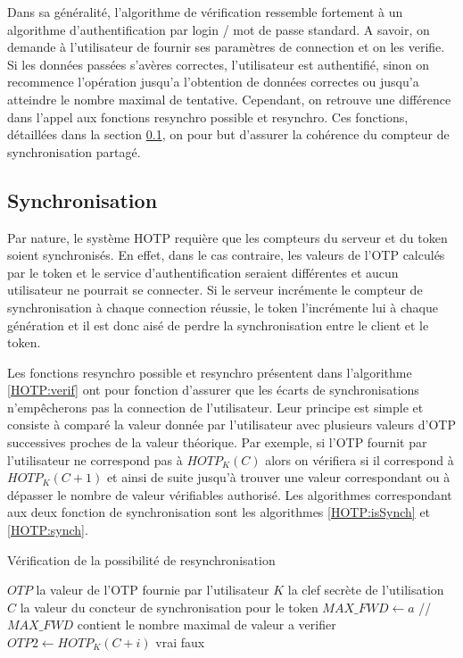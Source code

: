 \documentclass{../res/univ-projet}
\begin{document}
  Dans sa généralité, l'algorithme de vérification ressemble fortement à un algorithme d'authentification par login / mot de passe standard. A savoir, on demande à 
  l'utilisateur de fournir ses paramètres de connection et on les verifie. Si les données passées s'avères correctes, l'utilisateur est authentifié, sinon on recommence 
  l'opération jusqu'a l'obtention de données correctes ou jusqu'a atteindre le nombre maximal de tentative. Cependant, on retrouve une différence dans l'appel aux 
  fonctions \og{}resynchro possible\fg{} et \og{}resynchro\fg{}. Ces fonctions, détaillées dans la section \ref{HOTP:synchro}, on pour but d'assurer la cohérence du 
  compteur de synchronisation partagé.
  
  \subsection{Synchronisation}
  \label{HOTP:synchro}
  Par nature, le système HOTP requière que les compteurs du serveur et du token soient synchronisés. En effet, dans le cas contraire, les valeurs de l'OTP calculés par le 
  token et le service d'authentification seraient différentes et aucun utilisateur ne pourrait se connecter.  Si le serveur incrémente le compteur de synchronisation à 
  chaque connection réussie, le token l'incrémente lui à chaque génération et il est donc aisé de perdre la synchronisation entre le client et le token.
  
  Les fonctions \og{}resynchro possible\fg{} et \og{}resynchro\fg{} présentent dans l'algorithme \ref{HOTP:verif} ont pour fonction d'assurer que les écarts de 
  synchronisations n'emp\^echerons pas la connection de l'utilisateur. Leur principe est simple et consiste à comparé la valeur donnée par l'utilisateur avec plusieurs 
  valeurs d'OTP successives proches de la valeur théorique. Par exemple, si l'OTP fournit par l'utilisateur ne correspond pas à $HOTP_K(C)$ alors on vérifiera si il 
  correspond à $HOTP_K(C + 1)$ et ainsi de suite jusqu'à trouver une valeur correspondant ou à dépasser le nombre de valeur vérifiables authorisé. Les algorithmes 
  correspondant aux deux fonction de synchronisation sont les algorithmes \ref{HOTP:isSynch} et \ref{HOTP:synch}.

  \begin{algorithm}
    \caption{Vérification de la possibilité de resynchronisation}
    \label{HOTP:isSynch}
    
    \begin{algorithmic}
      \REQUIRE $OTP$ la valeur de l'OTP fournie par l'utilisateur
      \REQUIRE $K$ la clef secrète de l'utilisation
      \REQUIRE $C$ la valeur du concteur de synchronisation pour le token
      \STATE $MAX\_FWD \leftarrow a$ //$MAX\_FWD$ contient le nombre maximal de valeur a verifier
	\STATE $OTP2 \leftarrow HOTP_K(C + i)$
	  \RETURN vrai
	\ENDIF
      \ENDFOR
      \RETURN faux
    \end{algorithmic}
  \end{algorithm}
  
\end{document}
